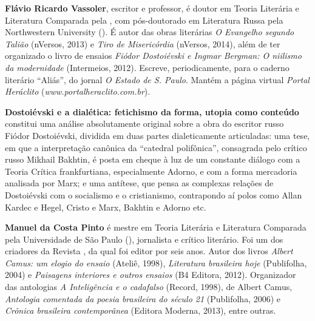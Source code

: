 
\textbf{Flávio Ricardo Vassoler}, escritor e professor, é doutor em Teoria Literária e Literatura Comparada pela , com pós-doutorado em Literatura Russa pela Northwestern University (). É autor das obras literárias \emph{O Evangelho segundo Talião} (nVersos, 2013) e \emph{Tiro de Misericórdia} (nVersos, 2014), além de ter organizado o livro de ensaios \emph{Fiódor Dostoiévski e Ingmar Bergman: O niilismo da modernidade} (Intermeios, 2012). Escreve, periodicamente, para o caderno literário ``Aliás'', do jornal \emph{O Estado de S. Paulo}. Mantém a página virtual \emph{Portal Heráclito} (\emph{www.portalheraclito.com.br}).

\textbf{Dostoiévski e a dialética: fetichismo da forma, utopia como conteúdo} constitui uma análise absolutamente original sobre a obra do escritor russo Fiódor Dostoiévski, dividida em duas partes dialeticamente articuladas: uma tese, em que a interpretação canônica da ``catedral polifônica'', consagrada pelo crítico russo Mikhail Bakhtin, é posta em cheque à luz de um constante diálogo com a Teoria Crítica frankfurtiana, especialmente Adorno, e com a forma mercadoria analisada por Marx; e uma antítese, que pensa as complexas relações de Dostoiévski com o socialismo e o cristianismo, contrapondo aí polos como Allan Kardec e Hegel, Cristo e Marx, Bakhtin e Adorno etc.

\textbf{Manuel da Costa Pinto} é mestre em Teoria Literária e Literatura Comparada pela Universidade de São Paulo (), jornalista e crítico literário. Foi um dos criadores da Revista , da qual foi editor por seis anos. Autor dos livros \emph{Albert Camus: um elogio do ensaio} (Ateliê, 1998), \emph{Literatura brasileira hoje} (Publifolha, 2004) e \emph{Paisagens interiores e outros ensaios} (B4 Editora, 2012). Organizador das antologias \emph{A Inteligência e o cadafalso} (Record, 1998), de Albert Camus, \emph{Antologia comentada da poesia brasileira do século 21} (Publifolha, 2006) e \emph{Crônica brasileira contemporânea} (Editora Moderna, 2013), entre outras.






